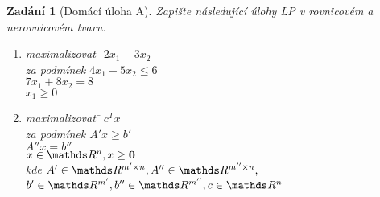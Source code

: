 

\newtheorem*{zadani}{Zadání}
\newtheorem*{reseni}{Řešení}


\begin{zadani}[Domácí úloha A]
Zapište následující úlohy LP v rovnicovém a nerovnicovém tvaru.
\begin{enumerate}
\item
	\begin{tabbing}
		maximalizovat \= $2x_1 - 3x_2$ \\
		za podmínek \> $4x_1 - 5x_2 \leq 6$ \\
		\> $7x_1 + 8x_2 = 8 $ \\
		\> $x_1 \geq 0$
	\end{tabbing}

\item
	\begin{tabbing}
		maximalizovat \= $c^Tx$ \\
		za podmínek \> $A'x \geq b'$ \\
		\> $A''x = b''$ \\
		\> $x \in \R^n, x \geq \vec 0$ \\
		\> kde $A' \in \R^{m' \times n}, A'' \in \R^{m'' \times n},$\\
		\> $b' \in \R^{m'}, b'' \in \R^{m''}, c \in \R^{n}$
	\end{tabbing}
\end{enumerate}
\end{zadani}

